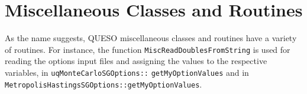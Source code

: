%

\section{Miscellaneous Classes and Routines}

As the name suggests, QUESO miscellaneous classes and routines have a variety of routines.
For instance, the function \verb+MiscReadDoublesFromString+ is used for reading the options input files and assigning the values to the respective variables, in \texttt{uqMonteCarloSGOptions::} \texttt{getMyOptionValues} and in \verb+MetropolisHastingsSGOptions::getMyOptionValues+.

